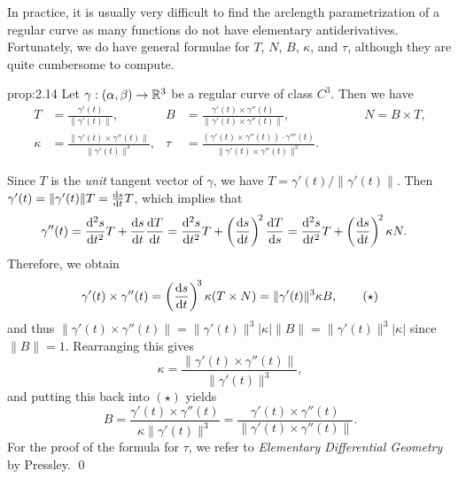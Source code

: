 In practice, it is usually very difficult to find the arclength 
parametrization of a regular curve as many functions do not 
have elementary antiderivatives. Fortunately, we do have general formulae for 
$T$, $N$, $B$, $\kappa$, and $\tau$, although they are quite cumbersome to 
compute.

\begin{prop}{prop:2.14}
    Let $\gamma : (\alpha, \beta) \to \mathbb{R}^3$ be a regular curve of class $C^3$. 
    Then we have 
    \begin{align*}
        T &= \frac{\gamma'(t)}{\|\gamma'(t)\|}, &
        B &= \frac{\gamma'(t) \times \gamma''(t)}{\|\gamma'(t) \times \gamma''(t)\|}, \quad\quad\quad\quad\quad\quad 
        N = B \times T, \\ 
        \kappa &= \frac{\|\gamma'(t) \times \gamma''(t)\|}{\|\gamma'(t)\|^3}, &
        \tau &= \frac{(\gamma'(t) \times \gamma''(t)) \cdot \gamma'''(t)}{\|\gamma'(t) \times \gamma''(t)\|^2}.
    \end{align*}
\end{prop}\vspace{-0.25cm}
\newpage 
\begin{pf}
    Since $T$ is the \emph{unit} tangent vector of $\gamma$, we have 
    $T = \gamma'(t)/\|\gamma'(t)\|$. Then $\gamma'(t) = \|\gamma'(t)\|T 
    = \frac{{\rm d}s}{{\rm d}t} T$, which implies that 
    \begin{align*}
        \gamma''(t) &= \frac{{\rm d}^2 s}{{\rm d}t^2} T 
        + \frac{{\rm d}s}{{\rm d}t} \frac{{\rm d}T}{{\rm d}t} 
        = \frac{{\rm d}^2 s}{{\rm d}t^2} T 
        + \left(\frac{{\rm d}s}{{\rm d}t}\right)^{\!2} \frac{{\rm d}T}{{\rm d}s}
        = \frac{{\rm d}^2 s}{{\rm d}t^2} T 
        + \left(\frac{{\rm d}s}{{\rm d}t}\right)^{\!2} \kappa N. 
    \end{align*}
    Therefore, we obtain 
    \[ \gamma'(t) \times \gamma''(t) = 
    \left(\frac{{\rm d}s}{{\rm d}t}\right)^{\!3} \kappa(T \times N) 
    = \|\gamma'(t)\|^3 \kappa B, \tag{$\star$} \] 
    and thus $\|\gamma'(t) \times \gamma''(t)\| = \|\gamma'(t)\|^3 |\kappa| \|B\| 
    = \|\gamma'(t)\|^3 |\kappa|$ since $\|B\| = 1$. Rearranging this gives 
    \[ \kappa = \frac{\|\gamma'(t) \times \gamma''(t)\|}{\|\gamma'(t)\|^3}, \] 
    and putting this back into $(\star)$ yields 
    \[ B = \frac{\gamma'(t) \times \gamma''(t)}{\kappa \|\gamma'(t)\|^3} 
    = \frac{\gamma'(t) \times \gamma''(t)}{\|\gamma'(t) \times \gamma''(t)\|}. \] 
    For the proof of the formula for $\tau$, we refer to \emph{Elementary 
    Differential Geometry} by Pressley. \qed 
\end{pf}\vspace{-0.25cm} 

